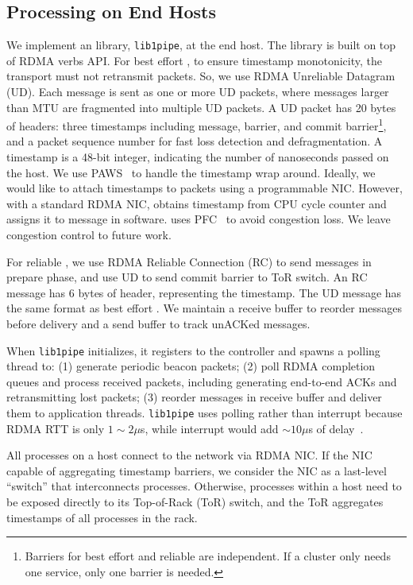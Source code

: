\subsection{Processing on End Hosts}

We implement an \sys{} library, \texttt{lib1pipe}, at the end host. The library is built on top of RDMA verbs API.
For best effort \sys{}, to ensure timestamp monotonicity, the transport must not retransmit packets.
So, we use RDMA Unreliable Datagram (UD).
Each \sys{} message is sent as one or more UD packets, where \sys{} messages larger than MTU are fragmented into multiple UD packets.
A UD packet has 20 bytes of headers: three timestamps including message, barrier, and commit barrier\footnote{Barriers for best effort and reliable \sys{} are independent. If a cluster only needs one service, only one barrier is needed.}, and a packet sequence number for fast loss detection and defragmentation.
A timestamp is a 48-bit integer, indicating the number of nanoseconds passed on the host. %
We use PAWS~\cite{jacobson1992tcp} to handle the timestamp wrap around.
Ideally, we would like to attach timestamps to packets using a programmable NIC.
However, with a standard RDMA NIC, \sys{} obtains timestamp from CPU cycle counter and assigns it to message in software.
\sys{} uses PFC~\cite{pfc} to avoid congestion loss. We leave congestion control to future work.

For reliable \sys{}, we use RDMA Reliable Connection (RC) to send messages in prepare phase, and use UD to send commit barrier to ToR switch.
An RC message has 6 bytes of header, representing the timestamp.
The UD message has the same format as best effort \sys{}.
We maintain a receive buffer to reorder messages before delivery and a send buffer to track unACKed messages.

When \texttt{lib1pipe} initializes, it registers to the controller and spawns a polling thread to: (1) generate periodic beacon packets; (2) poll RDMA completion queues and process received packets, including generating end-to-end ACKs and retransmitting lost packets; (3) reorder messages in receive buffer and deliver them to application threads.
\texttt{lib1pipe} uses polling rather than interrupt because RDMA RTT is only $1\sim2 \mu$s, while interrupt would add $\sim10 \mu$s of delay~\cite{yang2012poll}.

All processes on a host connect to the network via RDMA NIC. If the NIC capable of aggregating timestamp barriers, we consider the NIC as a last-level ``switch'' that interconnects processes. Otherwise, processes within a host need to be exposed directly to its Top-of-Rack (ToR) switch, and the ToR aggregates timestamps of all processes in the rack.

